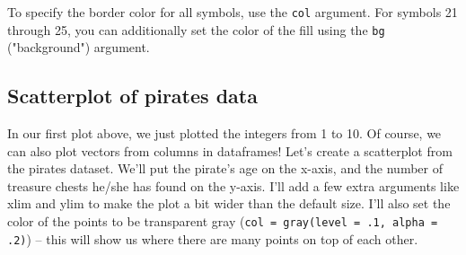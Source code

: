 \documentclass{tufte-book}\usepackage[]{graphicx}\usepackage[]{color}
\begin{document}
To specify the border color for all symbols, use the \texttt{col} argument. For symbols 21 through 25, you can additionally set the color of the fill using the \texttt{bg} ("background") argument.



\subsection{Scatterplot of pirates data}

In our first plot above, we just plotted the integers from 1 to 10. Of course, we can also plot vectors from columns in dataframes! Let's create a scatterplot from the pirates dataset. We'll put the pirate's age on the x-axis, and the number of treasure chests he/she has found on the y-axis. I'll add a few extra arguments like xlim and ylim to make the plot a bit wider than the default size. I'll also set the color of the points to be transparent gray (\texttt{col = gray(level = .1, alpha = .2)}) -- this will show us where there are many points on top of each other.

\end{document}
